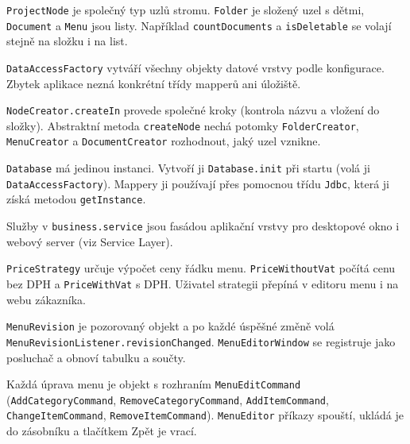 \begin{description}[itemsep=2pt,style=unboxed]
  \item[Composite] \texttt{ProjectNode} je společný typ uzlů stromu. \texttt{Folder} je složený uzel s dětmi, \texttt{Document} a \texttt{Menu} jsou listy. Například \texttt{countDocuments} a \texttt{isDeletable} se volají stejně na složku i na list.
  \item[Factory] \texttt{DataAccessFactory} vytváří všechny objekty datové vrstvy podle konfigurace. Zbytek aplikace nezná konkrétní třídy mapperů ani úložiště.
  \item[Factory Method] \texttt{NodeCreator.createIn} provede společné kroky (kontrola názvu a vložení do složky). Abstraktní metoda \texttt{createNode} nechá potomky \texttt{FolderCreator}, \texttt{MenuCreator} a \texttt{DocumentCreator} rozhodnout, jaký uzel vznikne.
  \item[Singleton] \texttt{Database} má jedinou instanci. Vytvoří ji \texttt{Database.init} při startu (volá ji \texttt{DataAccessFactory}). Mappery ji používají přes pomocnou třídu \texttt{Jdbc}, která ji získá metodou \texttt{getInstance}.
  \item[Facade] Služby v \texttt{business.service} jsou fasádou aplikační vrstvy pro desktopové okno i webový server (viz Service Layer).
  \item[Strategy] \texttt{PriceStrategy} určuje výpočet ceny řádku menu. \texttt{PriceWithoutVat} počítá cenu bez DPH a \texttt{PriceWithVat} s DPH. Uživatel strategii přepíná v editoru menu i na webu zákazníka.
  \item[Observer] \texttt{MenuRevision} je pozorovaný objekt a po každé úspěšné změně volá \texttt{MenuRevisionListener.revisionChanged}. \texttt{MenuEditorWindow} se registruje jako posluchač a obnoví tabulku a součty.
  \item[Command] Každá úprava menu je objekt s rozhraním \texttt{MenuEditCommand} (\texttt{AddCategoryCommand}, \texttt{RemoveCategoryCommand}, \texttt{AddItemCommand}, \texttt{ChangeItemCommand}, \texttt{RemoveItemCommand}). \texttt{MenuEditor} příkazy spouští, ukládá je do zásobníku a tlačítkem Zpět je vrací.
\end{description}
\endgroup
